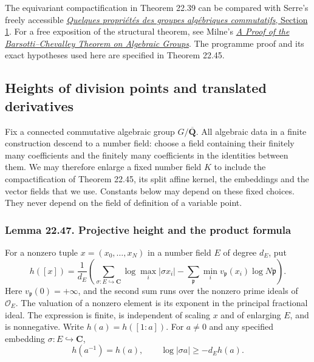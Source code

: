 \documentclass[
  11pt,
  a4paper,
]{article}
\begin{document}
The equivariant compactification in Theorem 22.39 can be compared with
Serre's freely accessible
\href{https://numdam.org/item/AST_1979__69-70__191_0.pdf}{\emph{Quelques
propriétés des groupes algébriques commutatifs}, Section 1}. For a free
exposition of the structural theorem, see Milne's
\href{https://arxiv.org/abs/1311.6060}{\emph{A Proof of the
Barsotti--Chevalley Theorem on Algebraic Groups}}. The programme proof
and its exact hypotheses used here are specified in Theorem 22.45.

\subsection{Heights of division points and translated
derivatives}\label{heights-of-division-points-and-translated-derivatives}

Fix a connected commutative algebraic group \(G/\overline{\mathbf Q}\).
All algebraic data in a finite construction descend to a number field:
choose a field containing their finitely many coefficients and the
finitely many coefficients in the identities between them. We may
therefore enlarge a fixed number field \(K\) to include the
compactification of Theorem 22.45, its split affine kernel, the
embeddings and the vector fields that we use. Constants below may depend
on these fixed choices. They never depend on the field of definition of
a variable point.

\subsubsection{Lemma 22.47. Projective height and the product
formula}\label{lemma-22.47.-projective-height-and-the-product-formula}

For a nonzero tuple \(x=(x_0,\ldots,x_N)\) in a number field \(E\) of
degree \(d_E\), put \[
 h([x])=\frac1{d_E}\left(
 \sum_{\sigma:E\hookrightarrow\mathbf C}\log\max_i|\sigma x_i|
 -\sum_{\mathfrak p}\min_i v_{\mathfrak p}(x_i)\log N\mathfrak p
 \right).
 \tag{22.110}
\] Here \(v_{\mathfrak p}(0)=+\infty\), and the second sum runs over the
nonzero prime ideals of \(\mathcal O_E\). The valuation of a nonzero
element is its exponent in the principal fractional ideal. The
expression is finite, is independent of scaling \(x\) and of enlarging
\(E\), and is nonnegative. Write \(h(a)=h([1:a])\). For \(a\ne0\) and
any specified embedding \(\sigma:E\hookrightarrow\mathbf C\), \[
 h(a^{-1})=h(a),\qquad
 \log|\sigma a|\ge-d_Eh(a).
 \tag{22.111}
\]
\end{document}
